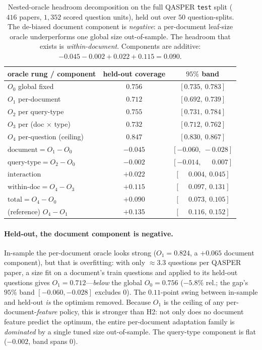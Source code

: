 \documentclass[11pt]{article}
\begin{document}
\begin{table}[t]
\centering
\small
\begin{tabular}{lcc}
\toprule
oracle rung / component & held-out coverage & $95\%$ band \\
\midrule
$O_0$ global fixed              & $0.756$ & $[0.735,\ 0.783]$ \\
$O_1$ per-document              & $0.712$ & $[0.692,\ 0.739]$ \\
$O_2$ per query-type            & $0.755$ & $[0.731,\ 0.784]$ \\
$O_3$ per (doc $\times$ type)   & $0.732$ & $[0.712,\ 0.762]$ \\
$O_4$ per-question (ceiling)    & $0.847$ & $[0.830,\ 0.867]$ \\
\midrule
$\mathrm{document}=O_1-O_0$     & $-0.045$ & $[-0.060,\ -0.028]$ \\
$\mathrm{query\text{-}type}=O_2-O_0$ & $-0.002$ & $[-0.014,\ \phantom{+}0.007]$ \\
$\mathrm{interaction}$         & $+0.022$ & $[\phantom{+}0.004,\ 0.045]$ \\
$\mathrm{within\text{-}doc}=O_4-O_3$ & $+0.115$ & $[\phantom{+}0.097,\ 0.131]$ \\
\midrule
$\mathrm{total}=O_4-O_0$        & $+0.090$ & $[\phantom{+}0.073,\ 0.105]$ \\
(reference) $O_4-O_1$           & $+0.135$ & $[\phantom{+}0.116,\ 0.152]$ \\
\bottomrule
\end{tabular}
\caption{Nested-oracle headroom decomposition on the full QASPER \texttt{test}
split ($416$ papers, $1{,}352$ scored question units), held out over $50$
question-splits. The de-biased $\mathrm{document}$ component is \emph{negative}: a
per-document leaf-size oracle underperforms one global size out-of-sample. The
headroom that exists is \emph{within-document}. Components are additive:
$-0.045-0.002+0.022+0.115=0.090$.}
\label{tab:headroom}
\end{table}

\paragraph{Held-out, the document component is negative.} In-sample the
per-document oracle looks strong ($O_1=0.824$, a $+0.065$ document component), but
that is overfitting: with only $\approx 3.3$ questions per QASPER paper, a size fit
on a document's train questions and applied to its held-out questions gives
$O_1=0.712$---\emph{below} the global $O_0=0.756$ ($-5.8\%$ rel.; the gap's $95\%$
band $[-0.060,-0.028]$ excludes $0$). The $0.11$-point swing between in-sample and
held-out \emph{is} the optimism removed. Because $O_1$ is the ceiling of any
per-document-\emph{feature} policy, this is stronger than H2: not only does no
document feature predict the optimum, the entire per-document adaptation family is
\emph{dominated} by a single tuned size out-of-sample. The query-type component is
flat ($-0.002$, band spans $0$).
\end{document}
